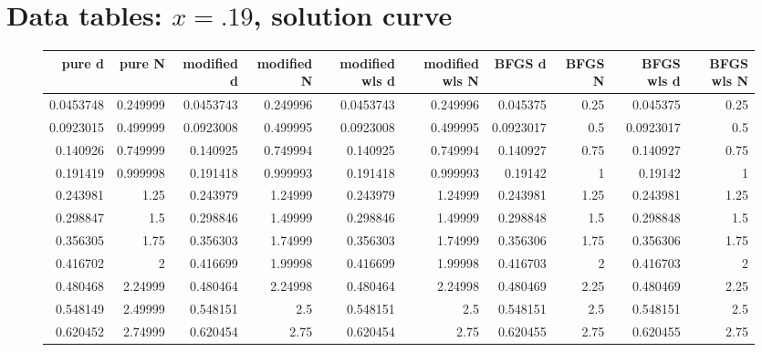 \documentclass[10pt,letterpaper]{article}
\begin{document}
\pagebreak
\section{Data tables: $x=.19$, solution curve}
\begin{figure}
\begin{tabular}{rrrrrrrrrr}
\hline
    pure d &    pure N &   modified d &   modified N &   modified wls d &   modified wls N &      BFGS d &    BFGS N &   BFGS wls d &   BFGS wls N \\
\hline
 0.0453748 &  0.249999 &    0.0453743 &     0.249996 &        0.0453743 &         0.249996 &   0.045375  &   0.25    &    0.045375  &      0.25    \\
 0.0923015 &  0.499999 &    0.0923008 &     0.499995 &        0.0923008 &         0.499995 &   0.0923017 &   0.5     &    0.0923017 &      0.5     \\
 0.140926  &  0.749999 &    0.140925  &     0.749994 &        0.140925  &         0.749994 &   0.140927  &   0.75    &    0.140927  &      0.75    \\
 0.191419  &  0.999998 &    0.191418  &     0.999993 &        0.191418  &         0.999993 &   0.19142   &   1       &    0.19142   &      1       \\
 0.243981  &  1.25     &    0.243979  &     1.24999  &        0.243979  &         1.24999  &   0.243981  &   1.25    &    0.243981  &      1.25    \\
 0.298847  &  1.5      &    0.298846  &     1.49999  &        0.298846  &         1.49999  &   0.298848  &   1.5     &    0.298848  &      1.5     \\
 0.356305  &  1.75     &    0.356303  &     1.74999  &        0.356303  &         1.74999  &   0.356306  &   1.75    &    0.356306  &      1.75    \\
 0.416702  &  2        &    0.416699  &     1.99998  &        0.416699  &         1.99998  &   0.416703  &   2       &    0.416703  &      2       \\
 0.480468  &  2.24999  &    0.480464  &     2.24998  &        0.480464  &         2.24998  &   0.480469  &   2.25    &    0.480469  &      2.25    \\
 0.548149  &  2.49999  &    0.548151  &     2.5      &        0.548151  &         2.5      &   0.548151  &   2.5     &    0.548151  &      2.5     \\
 0.620452  &  2.74999  &    0.620454  &     2.75     &        0.620454  &         2.75     &   0.620455  &   2.75    &    0.620455  &      2.75    \\

\end{tabular}
\end{figure}
\end{document}
